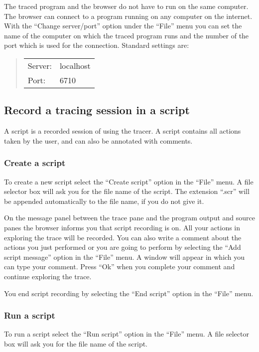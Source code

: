 \documentclass[12pt]{article}
\begin{document}
The traced program and the browser do not have to run on the same computer.
The browser can connect to a program running on any computer on the internet.
With the ``Change server/port'' option under the ``File'' menu you can set the name of the computer on which the traced program runs and the number of the port which is used for the connection. Standard settings are:
\begin{quote}
\begin{tabular}{ll}
Server: & localhost \\
Port: & 6710 \\
\end{tabular}
\end{quote}


\subsection{Record a tracing session in a script}

A script is a recorded session of using the tracer. A script
contains all actions taken by the user, and can also be annotated
with comments. 

\subsubsection{Create a script}

To create a new script select the ``Create script'' option in the ``File'' menu. A file selector box will ask you for the file name of the script. The extension ``.scr'' will be appended automatically to the file name, if you do not give it.

On the message panel between the trace pane and the program output and source panes the browser informs you that script recording is on. All your actions in exploring the trace will be recorded. You can also write a comment about the actions you just performed or you are going to perform by selecting the ``Add script message'' option in the ``File'' menu. A window will appear in which you can type your comment. Press ``Ok'' when you complete your comment and continue exploring the trace.

You end script recording by selecting the ``End script'' option in the ``File'' menu.

\subsubsection{Run a script}

To run a script select the ``Run script'' option in the ``File'' menu.
A file selector box will ask you for the file name of the script. 
\end{document}

